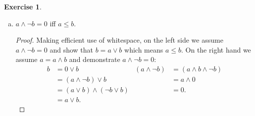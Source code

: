 \documentclass{article}
\theoremstyle{definition}
\newtheorem{question}{Exercise}
\begin{document}
\begin{question}
\begin{enumerate}[a)]
        \item \(a\wedge\neg b=0\) iff \(a\leq b\).

              \begin{proof}
                  Making efficient use of whitespace, on the left side we assume
                  \(a\wedge\neg b=0\) and show that \(b=a\vee b\) which means
                  \(a\leq b\). On the right hand we assume \(a=a\wedge b\) and
                  demonstrate \(a\wedge\neg b=0\):
                  \begin{align*}
                      b & =0\vee b                       & (a\wedge\neg b) & =(a\wedge b\wedge\neg b) \\
                        & =(a\wedge\neg b)\vee b         &                 & =a\wedge 0               \\
                        & =(a\vee b)\wedge(\neg b\vee b) &                 & =0.                      \\
                        & =a\vee b.
                  \end{align*}

              \end{proof}
    \end{enumerate}
\end{question}
\end{document}
